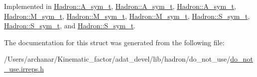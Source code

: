 Implemented in \mbox{\hyperlink{structHadron_1_1A__sym__t_ac60fe125eeb713995aafa4712e23f919}{Hadron\+::\+A\+\_\+sym\+\_\+t}}, \mbox{\hyperlink{structHadron_1_1A__sym__t_ac60fe125eeb713995aafa4712e23f919}{Hadron\+::\+A\+\_\+sym\+\_\+t}}, \mbox{\hyperlink{structHadron_1_1A__sym__t_ac60fe125eeb713995aafa4712e23f919}{Hadron\+::\+A\+\_\+sym\+\_\+t}}, \mbox{\hyperlink{structHadron_1_1M__sym__t_ad90bc816709bb65ec3e0b804090fbefe}{Hadron\+::\+M\+\_\+sym\+\_\+t}}, \mbox{\hyperlink{structHadron_1_1M__sym__t_ad90bc816709bb65ec3e0b804090fbefe}{Hadron\+::\+M\+\_\+sym\+\_\+t}}, \mbox{\hyperlink{structHadron_1_1M__sym__t_ad90bc816709bb65ec3e0b804090fbefe}{Hadron\+::\+M\+\_\+sym\+\_\+t}}, \mbox{\hyperlink{structHadron_1_1S__sym__t_a1a8ccb60f6d70c9a00b8683ad8eac195}{Hadron\+::\+S\+\_\+sym\+\_\+t}}, \mbox{\hyperlink{structHadron_1_1S__sym__t_a1a8ccb60f6d70c9a00b8683ad8eac195}{Hadron\+::\+S\+\_\+sym\+\_\+t}}, and \mbox{\hyperlink{structHadron_1_1S__sym__t_a1a8ccb60f6d70c9a00b8683ad8eac195}{Hadron\+::\+S\+\_\+sym\+\_\+t}}.



The documentation for this struct was generated from the following file\+:\begin{DoxyCompactItemize}
\item 
/\+Users/archanar/\+Kinematic\+\_\+factor/adat\+\_\+devel/lib/hadron/do\+\_\+not\+\_\+use/\mbox{\hyperlink{do__not__use_8irreps_8h}{do\+\_\+not\+\_\+use.\+irreps.\+h}}\end{DoxyCompactItemize}

